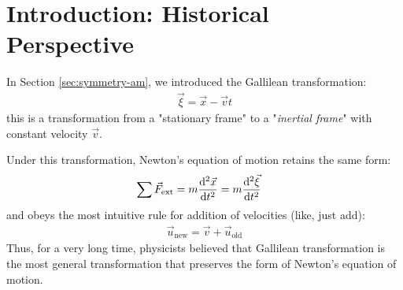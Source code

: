 \section{Introduction: Historical Perspective}
In Section \ref{sec:symmetry-am}, we introduced the Gallilean transformation:
\begin{align}
  \vec{\xi} = \vec{x} - \vec{v}t
\end{align}
this is a transformation from a "stationary frame" to a "\emph{inertial frame}" with constant velocity $\vec{v}$.

Under this transformation, Newton's equation of motion retains the same form:
\begin{align}
  \sum \vec{F}_{\text{ext}} & = m \odv[2]{\vec{x}}{t} = m \odv[2]{\vec{\xi}}{t}
\end{align}
and obeys the most intuitive rule for addition of velocities (like, just add):
\begin{align}
  \vec{u}_{\text{new}} = \vec{v} + \vec{u}_{\text{old}}
\end{align}
Thus, for a very long time, physicists believed that Gallilean transformation is the most general transformation that preserves the form of Newton's equation of motion.

